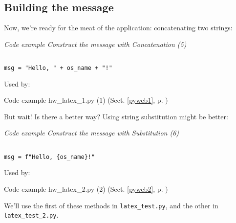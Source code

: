 \documentclass{article}
\begin{document}
\subsection{Building the message}

Now, we're ready for the meat of the application: concatenating two strings:

\label{pyweb5}
    \begin{flushleft}
    \textit{Code example Construct the message with Concatenation (5)}
    \begin{Verbatim}[commandchars=\\\{\},codes={\catcode`$=3\catcode`^=7},frame=single]

msg = "Hello, " + os_name + "!"

\end{Verbatim}

    \footnotesize
    Used by:
    \begin{list}{}{}
    
    \item Code example hw_latex_1.py (1) (Sect. \ref{pyweb1}, p. \pageref{pyweb1})

    \end{list}
    \normalsize
\end{flushleft}


But wait!  Is there a better way?  Using string substitution might be
better:

\label{pyweb6}
    \begin{flushleft}
    \textit{Code example Construct the message with Substitution (6)}
    \begin{Verbatim}[commandchars=\\\{\},codes={\catcode`$=3\catcode`^=7},frame=single]

msg = f"Hello, {os_name}!" 

\end{Verbatim}

    \footnotesize
    Used by:
    \begin{list}{}{}
    
    \item Code example hw_latex_2.py (2) (Sect. \ref{pyweb2}, p. \pageref{pyweb2})

    \end{list}
    \normalsize
\end{flushleft}


We'll use the first of these methods in \texttt{latex_test.py}, and the
other in \texttt{latex_test_2.py}.
\end{document}
